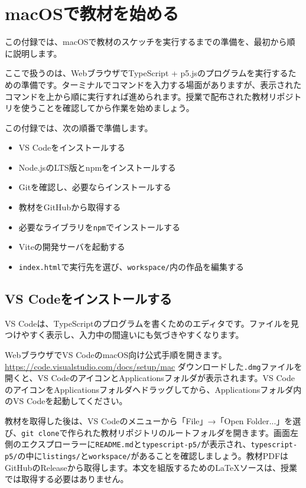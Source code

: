 \chapter{macOSで教材を始める}
\label{app:macos-setup}

この付録では、macOSで教材のスケッチを実行するまでの準備を、最初から順に説明します。

ここで扱うのは、WebブラウザでTypeScript + p5.jsのプログラムを実行するための準備です。ターミナルでコマンドを入力する場面がありますが、表示されたコマンドを上から順に実行すれば進められます。授業で配布された教材リポジトリを使うことを確認してから作業を始めましょう。

この付録では、次の順番で準備します。

\begin{itemize}
    \item VS Codeをインストールする
    \item Node.jsのLTS版とnpmをインストールする
    \item Gitを確認し、必要ならインストールする
    \item 教材をGitHubから取得する
    \item 必要なライブラリを\texttt{npm}でインストールする
    \item Viteの開発サーバを起動する
    \item \texttt{index.html}で実行先を選び、\texttt{workspace/}内の作品を編集する
\end{itemize}

\section{VS Codeをインストールする}

VS Codeは、TypeScriptのプログラムを書くためのエディタです。ファイルを見つけやすく表示し、入力中の間違いにも気づきやすくなります。

WebブラウザでVS CodeのmacOS向け公式手順を開きます。
\url{https://code.visualstudio.com/docs/setup/mac}
ダウンロードした\texttt{.dmg}ファイルを開くと、VS CodeのアイコンとApplicationsフォルダが表示されます。VS CodeのアイコンをApplicationsフォルダへドラッグしてから、Applicationsフォルダ内のVS Codeを起動してください。

教材を取得した後は、VS Codeのメニューから「File」→「Open Folder...」を選び、\texttt{git clone}で作られた教材リポジトリのルートフォルダを開きます。画面左側のエクスプローラーに\texttt{README.md}と\texttt{typescript-p5/}が表示され、\texttt{typescript-p5/}の中に\texttt{listings/}と\texttt{workspace/}があることを確認しましょう。教材PDFはGitHubのReleaseから取得します。本文を組版するためのLaTeXソースは、授業では取得する必要はありません。

